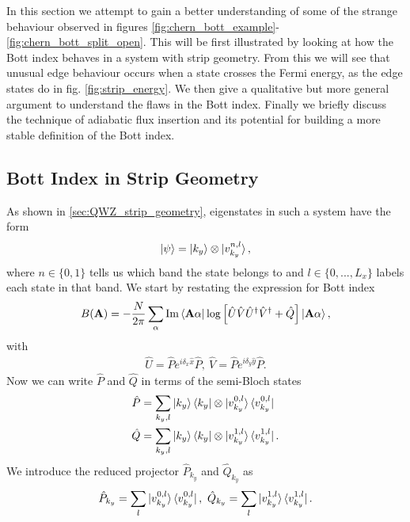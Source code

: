 
In this section we attempt to gain a better understanding of some of the strange behaviour observed in figures \ref{fig:chern_bott_example}-\ref{fig:chern_bott_split_open}. This will be first illustrated by looking at how the Bott index behaves in a system with strip geometry. From this we will see that unusual edge behaviour occurs when a state crosses the Fermi energy, as the edge states do in fig. \ref{fig:strip_energy}.  We then give a qualitative but more general argument to understand the flaws in the Bott index. Finally we briefly discuss the technique of adiabatic flux insertion and its potential for building a more stable definition of the Bott index.

\subsection{Bott Index in Strip Geometry}
As shown in \textsection\ref{sec:QWZ_strip_geometry}, eigenstates in such a system have the form
\begin{align}
    \ket{\psi} = \ket{k_y}\otimes \ket{v_{k_y}^{n,l}},
\end{align}
where $n \in \{ 0,1\}$ tells us which band the state belongs to and $l \in \{ 0,...,L_x\}$ labels each state in that band. We start by restating the expression for Bott index
\begin{align}
    B(\textbf{A}) = -\frac{N}{2\pi} \sum_\alpha \textup{Im} \bra{\textbf{A} \alpha} \log \left [ \hat U\hat V\hat U^\dag \hat V^\dag + \hat Q \right ]\ket{ \textbf{A} \alpha},
\end{align}
with
\begin{align}
	\hat U  = \hat P e^{i \delta_x \hat x} \hat P, \ \hat V  = \hat P e^{i \delta_y \hat y} \hat P.
\end{align}
Now we can write $\hat P$ and $\hat Q$ in terms of the semi-Bloch states
\begin{align}
	\hat P &=  \sum_{k_y, l} \ket{k_y} \bra{k_y} \otimes \ket{v_{k_y}^{0,l}}\bra{v_{k_y}^{0,l}} \\ 
	\hat Q  &=  \sum_{k_y, l} \ket{k_y} \bra{k_y} \otimes \ket{v_{k_y}^{1,l}}\bra{v_{k_y}^{1,l}}.
\end{align}
We introduce the reduced projector $\hat P_{k_y}$ and $\hat Q_{k_y}$ as
\begin{align}
	\hat P_{k_y} =  \sum_{l} \ket{v_{k_y}^{0,l}}\bra{v_{k_y}^{0,l}}, \ \hat Q_{k_y} =  \sum_{l} \ket{v_{k_y}^{1,l}}\bra{v_{k_y}^{1,l}}. 
\end{align}
